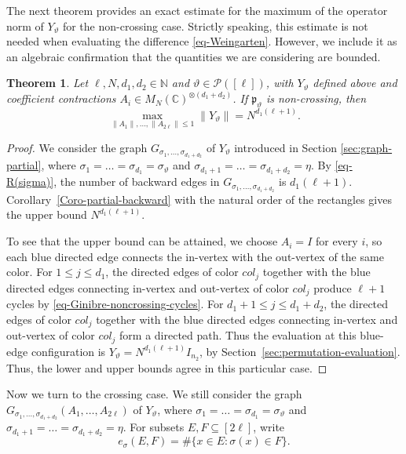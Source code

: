 \documentclass[12pt]{article}
\numberwithin{equation}{section}
\theoremstyle{plain}
\newtheorem{theorem}{Theorem}[section]
\def\bN{\mathbb N}
\def\bC{\mathbb C}
\def\cP{\mathcal P}
\begin{document}
The next theorem provides an exact estimate for the maximum of the operator norm of $Y_\vartheta$ for the non-crossing case. Strictly speaking, this estimate is not needed when evaluating the difference \eqref{eq-Weingarten}. However, we include it as an algebraic confirmation that the quantities we are considering are bounded.

\begin{theorem}\label{Thm-Ginibre-1}
Let $\ell,N,d_1,d_2\in\bN$ and $\vartheta\in\cP([\ell])$, with $Y_\vartheta$ defined above and coefficient contractions $A_i\in M_N(\bC)^{\otimes(d_1+d_2)}$. If $\mathfrak p_\vartheta$ is non-crossing, then
\[
\max_{\|A_1\|,\ldots,\|A_{2\ell}\|\le1}\|Y_\vartheta\|
=N^{d_1(\ell+1)}.
\]
\end{theorem}

\begin{proof}
We consider the graph $G_{\sigma_1,\ldots,\sigma_{d_1+d_2}}$ of $Y_\vartheta$ introduced in Section \ref{sec:graph-partial}, where $\sigma_1=\ldots=\sigma_{d_1} = \sigma_\vartheta$ and $\sigma_{d_1+1} = \ldots = \sigma_{d_1+d_2} = \eta$.
By \eqref{eq-R(sigma)}, the number of backward edges in $G_{\sigma_1,\ldots,\sigma_{d_1+d_2}}$ is $d_1(\ell+1)$.
Corollary~\ref{Coro-partial-backward} with the natural order of the rectangles gives the upper bound $N^{d_1(\ell+1)}$.

To see that the upper bound can be attained, we choose $A_i=I$ for every $i$, so each blue directed edge connects the in-vertex with the out-vertex of the same color.
For $1 \le j \le d_1$, the directed edges of color $col_j$ together with the blue directed edges connecting in-vertex and out-vertex of color $col_j$ produce $\ell+1$ cycles by \eqref{eq-Ginibre-noncrossing-cycles}.
For $d_1+1 \le j \le d_1+d_2$, the directed edges of color $col_j$ together with the blue directed edges connecting in-vertex and out-vertex of color $col_j$ form a directed path.
Thus the evaluation at this blue-edge configuration is $Y_\vartheta=N^{d_1(\ell+1)}I_{n_2}$, by Section~\ref{sec:permutation-evaluation}. Thus, the lower and upper bounds agree in this particular case.
\end{proof}

Now we turn to the crossing case.
We still consider the graph $G_{\sigma_1,\ldots,\sigma_{d_1+d_2}}(A_1,\ldots,A_{2\ell})$ of $Y_\vartheta$, where $\sigma_1=\ldots=\sigma_{d_1} = \sigma_\vartheta$ and $\sigma_{d_1+1} = \ldots = \sigma_{d_1+d_2} = \eta$.
For subsets $E,F\subseteq[2\ell]$, write
\[
 e_\sigma(E,F)=\#\{x\in E:\sigma(x)\in F\}.
\]
\end{document}
